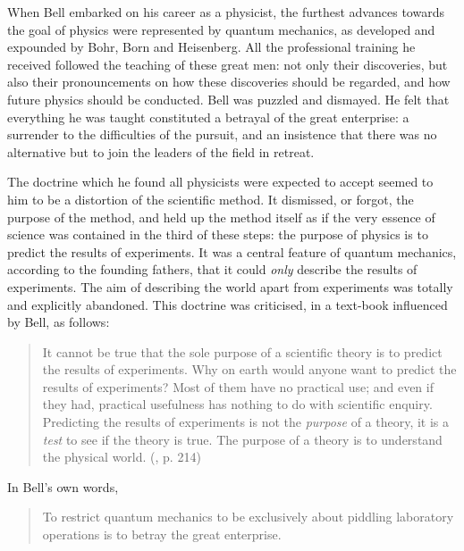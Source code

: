 \documentclass[12pt,reqno]{article}
\renewcommand{\(}{\left(}
\renewcommand{\)}{\right)}
\renewcommand{\.}{\centerdot}
\newcommand{\1}{\mathbf{1}}
\newcommand{\<}{\langle}
\renewcommand{\>}{\rangle}
\theoremstyle{definition}
\theoremstyle{remark}
\numberwithin{equation}{section}
\begin{document}
When Bell embarked on his career as a physicist, the furthest advances towards the goal of physics were represented by quantum mechanics, as developed and expounded by Bohr, Born and Heisenberg. All the professional training he received followed the teaching of these great men: not only their discoveries, but also their pronouncements on how these discoveries should be regarded, and how future physics should be conducted. Bell was puzzled and dismayed. He felt that everything he was taught constituted a betrayal of the great enterprise: a surrender to the difficulties of the pursuit, and an insistence that there was no alternative but to join the leaders of the field in retreat.

The doctrine which he found all physicists were expected to accept seemed to him to be a distortion of the scientific method. It dismissed, or forgot, the purpose of the method, and held up the method itself as if the very essence of science was contained in the third of these steps: the purpose of physics is to predict the results of experiments. It was a central feature of quantum mechanics, according to the founding fathers, that it could \emph{only} describe the results of experiments. The aim of describing the world apart from experiments was totally and explicitly abandoned. This doctrine was criticised, in a text-book influenced by Bell, as follows:
\begin{quote}
It cannot be true that the sole purpose of a scientific theory is to predict the results of experiments. Why on earth would anyone want to predict the results of experiments? Most of them have no practical use; and even if they had, practical usefulness has nothing to do with scientific enquiry. Predicting the results of experiments is not the \emph{purpose} of a theory, it is a \emph{test} to see if the theory is true. The purpose of a theory is to understand the physical world. (\cite{QMPN}, p. 214)
\end{quote}
In Bell's own words,
\begin{quote}
To restrict quantum mechanics to be exclusively about piddling laboratory operations is to betray the great enterprise.
\end{quote}
\end{document}
